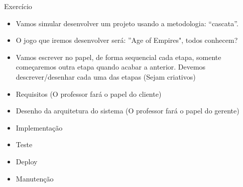 \begin{frame}
\begin{block}{Exercício}
	 \begin{itemize}
			\item Vamos simular desenvolver um projeto usando a metodologia: “cascata”.

			\item O jogo que iremos desenvolver será: ''Age of Empires", todos conhecem?
			
			\item Vamos escrever no papel, de forma sequencial cada etapa, somente começaremos outra etapa quando acabar a anterior. Devemos descrever/desenhar cada uma das etapas (Sejam criativos) 
			
			\item Requisitos (O professor fará o papel do cliente)
			
			\item Desenho da arquitetura do sistema (O professor fará o papel do gerente)
			
			\item Implementação
			
			\item Teste

			\item Deploy
			
			\item Manutenção

	 \end{itemize}
\end{block}
\end{frame}
